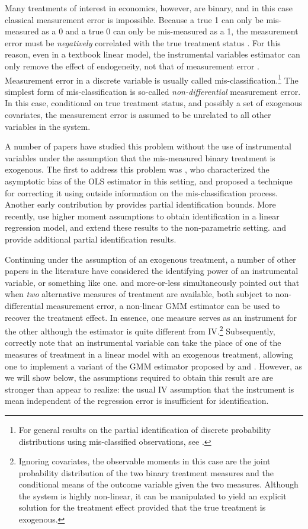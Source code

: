 Many treatments of interest in economics, however, are binary, and in this case classical measurement error is impossible.
Because a true 1 can only be mis-measured as a 0 and a true 0 can only be mis-measured as a 1, the measurement error must be \emph{negatively} correlated with the true treatment status \citep{Aigner,Bollinger}. 
For this reason, even in a textbook linear model, the instrumental variables estimator can only remove the effect of endogeneity, not that of measurement error \citep{FL}. 
Measurement error in a discrete variable is usually called mis-classification.\footnote{For general results on the partial identification of discrete probability distributions using mis-classified observations, see \cite{molinari}.}
The simplest form of mis-classification is so-called \emph{non-differential} measurement error.
In this case, conditional on true treatment status, and possibly a set of exogenous covariates, the measurement error is assumed to be unrelated to all other variables in the system.

A number of papers have studied this problem without the use of instrumental variables under the assumption that the mis-measured binary treatment is exogenous.
The first to address this problem was \cite{Aigner}, who characterized the asymptotic bias of the OLS estimator in this setting, and proposed a technique for correcting it using outside information on the mis-classification process.
Another early contribution by \cite{Bollinger} provides partial identification bounds.
More recently, \cite{ChenHuLewbel} use higher moment assumptions to obtain identification in a linear regression model, and \cite{ChenHuLewbel2} extend these results to the non-parametric setting. 
\cite{HasseltBollinger} and \cite{BollingerHasseltWP} provide additional partial identification results.

Continuing under the assumption of an exogenous treatment, a number of other papers in the literature have considered the identifying power of an instrumental variable, or something like one.
\cite{BBS} and \cite{KRS} more-or-less simultaneously pointed out that when \emph{two} alternative measures of treatment are available, both subject to non-differential measurement error, a non-linear GMM estimator can be used to recover the treatment effect.
In essence, one measure serves as an instrument for the other although the estimator is quite different from IV.\footnote{Ignoring covariates, the observable moments in this case are the joint probability distribution of the two binary treatment measures and the conditional means of the outcome variable given the two measures. Although the system is highly non-linear, it can be manipulated to yield an explicit solution for the treatment effect provided that the true treatment is exogenous.}
Subsequently, \cite{FL} correctly note that an instrumental variable can take the place of one of the measures of treatment in a linear model with an exogenous treatment, allowing one to implement a variant of the GMM estimator proposed by \cite{BBS} and \cite{KRS}.
However, as we will show below, the assumptions required to obtain this result are are stronger than \cite{FL} appear to realize: the usual IV assumption that the instrument is mean independent of the regression error is insufficient for identification. 

